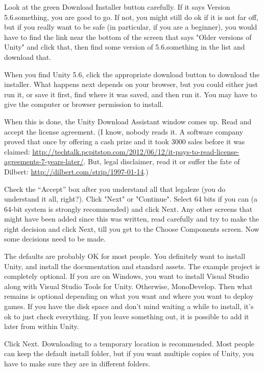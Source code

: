 \documentclass[12pt]{amsbook}
\theoremstyle{definition}
\theoremstyle{remark}
\numberwithin{figure}{chapter}
\numberwithin{table}{chapter}
\numberwithin{section}{chapter}
\numberwithin{equation}{section}
\begin{document}
Look at the green Download Installer button carefully.  If it says Version 5.6.something, you are good to go.  If not, you might still do ok if it is not far off, but if you really want to be safe (in particular, if you are a beginner), you would have to find the link near the bottom of the screen that says "Older versions of Unity" and click that, then find some version of 5.6.something in the list and download that. 

When you find Unity 5.6, click the appropriate download button to download the installer.  What happens next depends on your browser, but you could either just run it, or save it first, find where it was saved, and then run it.  You may have to give the computer or browser permission to install.

When this is done, the Unity Download Assistant window comes up.  Read and accept the license agreement.  (I know, nobody reads it.  A software company proved that once by offering a cash prize and it took 3000 sales before it was claimed: \url{http://techtalk.pcpitstop.com/2012/06/12/it-pays-to-read-license-agreements-7-years-later/}.  But, legal disclaimer, read it or suffer the fate of Dilbert: \url{http://dilbert.com/strip/1997-01-14}.) 

Check the ``Accept'' box after you understand all that legaleze (you do understand it all, right?).  Click "Next" or "Continue".  Select 64 bits if you can (a 64-bit system is strongly recommended) and click Next.  Any other screens that might have been added since this was written, read carefully and try to make the right decision and click Next, till you get to the Choose Components screen.  Now some decisions need to be made.

The defaults are probably OK for most people.  You definitely want to install Unity, and install the documentation and standard assets.  The example project is completely optional.  If you are on Windows, you want to install Visual Studio along with Visual Studio Tools for Unity.  Otherwise, MonoDevelop.  Then what remains is optional depending on what you want and where you want to deploy games.   If you have the disk space and don't mind waiting a while to install, it's ok to just check everything.  If you leave something out, it is possible to add it later from within Unity.

Click Next.  Downloading to a temporary location is recommended.  Most people can keep the default install folder, but if you want multiple copies of Unity, you have to make sure they are in different folders.
\end{document}

